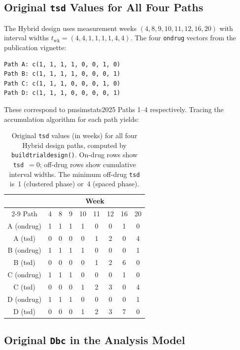 \documentclass[11pt]{article}
\begin{document}
\subsection{Original \texttt{tsd} Values for All Four Paths}

The Hybrid design uses measurement weeks $(4, 8, 9, 10, 11, 12, 16,
20)$ with interval widths $t_{\text{wk}} = (4, 4, 1, 1, 1, 1, 4, 4)$.
The four \texttt{ondrug} vectors from the publication vignette:

\begin{verbatim}
Path A: c(1, 1, 1, 1, 0, 0, 1, 0)
Path B: c(1, 1, 1, 1, 0, 0, 0, 1)
Path C: c(1, 1, 1, 0, 0, 0, 1, 0)
Path D: c(1, 1, 1, 0, 0, 0, 0, 1)
\end{verbatim}

\noindent These correspond to pmsimstats2025 Paths 1--4 respectively.
Tracing the accumulation algorithm for each path yields:

\begin{table}[h]
\centering
\caption{Original \texttt{tsd} values (in weeks) for all four
  Hybrid design paths, computed by \texttt{buildtrialdesign()}.
  On-drug rows show \texttt{tsd}~$= 0$; off-drug rows show
  cumulative interval widths. The minimum off-drug \texttt{tsd}
  is~1 (clustered phase) or~4 (spaced phase).}
\label{tab:orig_tsd}
\begin{tabular}{@{}ccccccccc@{}}
\toprule
 & \multicolumn{8}{c}{Week} \\
\cmidrule(l){2-9}
Path & 4 & 8 & 9 & 10 & 11 & 12 & 16 & 20 \\
\midrule
A (ondrug) & 1 & 1 & 1 & 1 & 0 & 0 & 1 & 0 \\
A (tsd)    & 0 & 0 & 0 & 0 & 1 & 2 & 0 & 4 \\
\midrule
B (ondrug) & 1 & 1 & 1 & 1 & 0 & 0 & 0 & 1 \\
B (tsd)    & 0 & 0 & 0 & 0 & 1 & 2 & 6 & 0 \\
\midrule
C (ondrug) & 1 & 1 & 1 & 0 & 0 & 0 & 1 & 0 \\
C (tsd)    & 0 & 0 & 0 & 1 & 2 & 3 & 0 & 4 \\
\midrule
D (ondrug) & 1 & 1 & 1 & 0 & 0 & 0 & 0 & 1 \\
D (tsd)    & 0 & 0 & 0 & 1 & 2 & 3 & 7 & 0 \\
\bottomrule
\end{tabular}
\end{table}

\subsection{Original \texttt{Dbc} in the Analysis Model}
\end{document}
